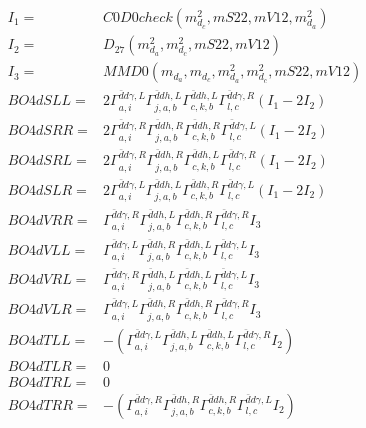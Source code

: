 \documentclass[A4,landscape]{article}
\begin{document}
\begin{align} 
I_1 = & C0D0check(m^2_{d_{{c}}}, mS22, mV12, m^2_{d_{{a}}}) \\ 
I_2 = & D_{27}(m^2_{d_{{a}}}, m^2_{d_{{c}}}, mS22, mV12) \\ 
I_3 = & MMD0(m_{d_{{a}}}, m_{d_{{c}}}, m^2_{d_{{a}}}, m^2_{d_{{c}}}, mS22, mV12) \\ 
  BO4dSLL= & 2  \Gamma^{\bar{d}d \gamma ,L}_{a, i} \Gamma^{\bar{d}d h ,L}_{j, a, b} \Gamma^{\bar{d}d h ,L}_{c, k, b} \Gamma^{\bar{d}d \gamma ,R}_{l, c} (I_1 - 2 I_2) \\ 
  BO4dSRR= & 2  \Gamma^{\bar{d}d \gamma ,R}_{a, i} \Gamma^{\bar{d}d h ,R}_{j, a, b} \Gamma^{\bar{d}d h ,R}_{c, k, b} \Gamma^{\bar{d}d \gamma ,L}_{l, c} (I_1 - 2 I_2) \\ 
  BO4dSRL= & 2  \Gamma^{\bar{d}d \gamma ,R}_{a, i} \Gamma^{\bar{d}d h ,R}_{j, a, b} \Gamma^{\bar{d}d h ,L}_{c, k, b} \Gamma^{\bar{d}d \gamma ,R}_{l, c} (I_1 - 2 I_2) \\ 
  BO4dSLR= & 2  \Gamma^{\bar{d}d \gamma ,L}_{a, i} \Gamma^{\bar{d}d h ,L}_{j, a, b} \Gamma^{\bar{d}d h ,R}_{c, k, b} \Gamma^{\bar{d}d \gamma ,L}_{l, c} (I_1 - 2 I_2) \\ 
  BO4dVRR= &  \Gamma^{\bar{d}d \gamma ,R}_{a, i} \Gamma^{\bar{d}d h ,L}_{j, a, b} \Gamma^{\bar{d}d h ,R}_{c, k, b} \Gamma^{\bar{d}d \gamma ,R}_{l, c} I_3 \\ 
  BO4dVLL= &  \Gamma^{\bar{d}d \gamma ,L}_{a, i} \Gamma^{\bar{d}d h ,R}_{j, a, b} \Gamma^{\bar{d}d h ,L}_{c, k, b} \Gamma^{\bar{d}d \gamma ,L}_{l, c} I_3 \\ 
  BO4dVRL= &  \Gamma^{\bar{d}d \gamma ,R}_{a, i} \Gamma^{\bar{d}d h ,L}_{j, a, b} \Gamma^{\bar{d}d h ,L}_{c, k, b} \Gamma^{\bar{d}d \gamma ,L}_{l, c} I_3 \\ 
  BO4dVLR= &  \Gamma^{\bar{d}d \gamma ,L}_{a, i} \Gamma^{\bar{d}d h ,R}_{j, a, b} \Gamma^{\bar{d}d h ,R}_{c, k, b} \Gamma^{\bar{d}d \gamma ,R}_{l, c} I_3 \\ 
  BO4dTLL= & -( \Gamma^{\bar{d}d \gamma ,L}_{a, i} \Gamma^{\bar{d}d h ,L}_{j, a, b} \Gamma^{\bar{d}d h ,L}_{c, k, b} \Gamma^{\bar{d}d \gamma ,R}_{l, c} I_2) \\ 
  BO4dTLR= & 0 \\ 
  BO4dTRL= & 0 \\ 
  BO4dTRR= & -( \Gamma^{\bar{d}d \gamma ,R}_{a, i} \Gamma^{\bar{d}d h ,R}_{j, a, b} \Gamma^{\bar{d}d h ,R}_{c, k, b} \Gamma^{\bar{d}d \gamma ,L}_{l, c} I_2) \\ 
\end{align} 
\end{document}
